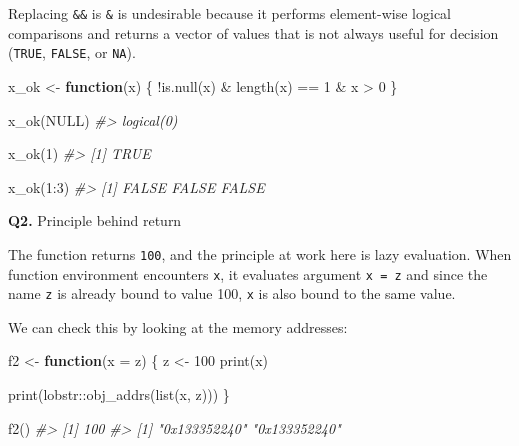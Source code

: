 \documentclass[
]{book}
\newenvironment{Shaded}{\begin{snugshade}}{\end{snugshade}}
\newcommand{\AttributeTok}[1]{\textcolor[rgb]{0.77,0.63,0.00}{#1}}
\newcommand{\CommentTok}[1]{\textcolor[rgb]{0.56,0.35,0.01}{\textit{#1}}}
\newcommand{\ConstantTok}[1]{\textcolor[rgb]{0.00,0.00,0.00}{#1}}
\newcommand{\ControlFlowTok}[1]{\textcolor[rgb]{0.13,0.29,0.53}{\textbf{#1}}}
\newcommand{\DecValTok}[1]{\textcolor[rgb]{0.00,0.00,0.81}{#1}}
\newcommand{\FunctionTok}[1]{\textcolor[rgb]{0.00,0.00,0.00}{#1}}
\newcommand{\NormalTok}[1]{#1}
\newcommand{\OtherTok}[1]{\textcolor[rgb]{0.56,0.35,0.01}{#1}}
\newcommand{\SpecialCharTok}[1]{\textcolor[rgb]{0.00,0.00,0.00}{#1}}
\begin{document}
Replacing \texttt{\&\&} is \texttt{\&} is undesirable because it performs element-wise logical comparisons and returns a vector of values that is not always useful for decision (\texttt{TRUE}, \texttt{FALSE}, or \texttt{NA}).

\begin{Shaded}
\begin{Highlighting}[]
\NormalTok{x\_ok }\OtherTok{\textless{}{-}} \ControlFlowTok{function}\NormalTok{(x) \{}
  \SpecialCharTok{!}\FunctionTok{is.null}\NormalTok{(x) }\SpecialCharTok{\&} \FunctionTok{length}\NormalTok{(x) }\SpecialCharTok{==} \DecValTok{1} \SpecialCharTok{\&}\NormalTok{ x }\SpecialCharTok{\textgreater{}} \DecValTok{0}
\NormalTok{\}}

\FunctionTok{x\_ok}\NormalTok{(}\ConstantTok{NULL}\NormalTok{)}
\CommentTok{\#\textgreater{} logical(0)}

\FunctionTok{x\_ok}\NormalTok{(}\DecValTok{1}\NormalTok{)}
\CommentTok{\#\textgreater{} [1] TRUE}

\FunctionTok{x\_ok}\NormalTok{(}\DecValTok{1}\SpecialCharTok{:}\DecValTok{3}\NormalTok{)}
\CommentTok{\#\textgreater{} [1] FALSE FALSE FALSE}
\end{Highlighting}
\end{Shaded}

\textbf{Q2.} Principle behind return

The function returns \texttt{100}, and the principle at work here is lazy evaluation. When function environment encounters \texttt{x}, it evaluates argument \texttt{x\ =\ z} and since the name \texttt{z} is already bound to value 100, \texttt{x} is also bound to the same value.

We can check this by looking at the memory addresses:

\begin{Shaded}
\begin{Highlighting}[]
\NormalTok{f2 }\OtherTok{\textless{}{-}} \ControlFlowTok{function}\NormalTok{(}\AttributeTok{x =}\NormalTok{ z) \{}
\NormalTok{  z }\OtherTok{\textless{}{-}} \DecValTok{100}
  \FunctionTok{print}\NormalTok{(x)}

  \FunctionTok{print}\NormalTok{(lobstr}\SpecialCharTok{::}\FunctionTok{obj\_addrs}\NormalTok{(}\FunctionTok{list}\NormalTok{(x, z)))}
\NormalTok{\}}

\FunctionTok{f2}\NormalTok{()}
\CommentTok{\#\textgreater{} [1] 100}
\CommentTok{\#\textgreater{} [1] "0x133352240" "0x133352240"}
\end{Highlighting}
\end{Shaded}
\end{document}
